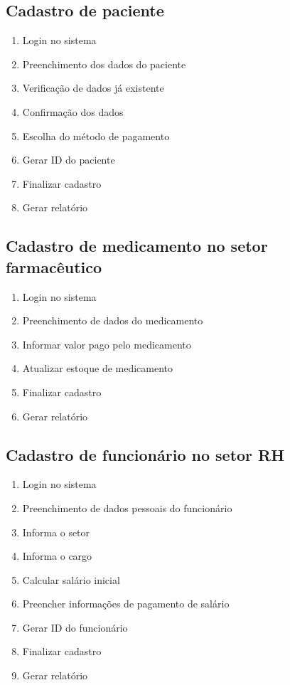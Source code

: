     \subsection{ Cadastro de paciente}
\begin{enumerate}
  \item Login no sistema
  \item Preenchimento dos dados do paciente
  \item Verificação de dados já existente
  \item Confirmação dos dados
  \item Escolha do método de pagamento
  \item Gerar ID do paciente
  \item Finalizar cadastro
  \item Gerar relatório
\end{enumerate}

    \subsection{ Cadastro de medicamento no setor farmacêutico}
\begin{enumerate}
  \item Login no sistema
  \item Preenchimento de dados do medicamento
  \item Informar valor pago pelo medicamento
  \item Atualizar estoque de medicamento
  \item Finalizar cadastro
  \item Gerar relatório
\end{enumerate}


    \subsection{ Cadastro de funcionário no setor RH}
\begin{enumerate}
  \item Login no sistema
  \item Preenchimento de dados pessoais do funcionário
  \item Informa o setor
  \item Informa o cargo
  \item Calcular salário inicial
  \item Preencher informações de pagamento de salário
  \item Gerar ID do funcionário
  \item Finalizar cadastro
  \item Gerar relatório

\end{enumerate}

